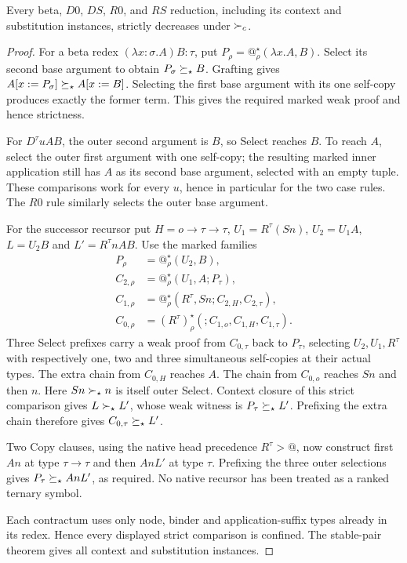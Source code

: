 \begin{theorem}\label{thm:orient}
Every beta, $D0$, $DS$, $R0$, and $RS$ reduction, including its context
and substitution instances, strictly decreases under $\succ_c$.
\end{theorem}
\begin{proof}
For a beta redex $(\lambda x:\sigma.A)B:\tau$, put
$P_\rho=@^\star_\rho(\lambda x.A,B)$. Select its second base argument
to obtain $P_\sigma\succeq_\star B$. Grafting gives
$A[x:=P_\sigma]\succeq_\star A[x:=B]$. Selecting the first base argument
with its one self-copy produces exactly the former term. This gives
the required marked weak proof and hence strictness.

For $D^\tau uAB$, the outer second argument is $B$, so Select reaches
$B$. To reach $A$, select the outer first argument with one self-copy;
the resulting marked inner application still has $A$ as its second
base argument, selected with an empty tuple. These comparisons work
for every $u$, hence in particular for the two case rules. The $R0$
rule similarly selects the outer base argument.

For the successor recursor put $H=o\to\tau\to\tau$,
$U_1=R^\tau(Sn)$, $U_2=U_1A$, $L=U_2B$ and $L'=R^\tau nAB$.
Use the marked families
\[
\begin{aligned}
 P_\rho&=@^\star_\rho(U_2,B),\\
 C_{2,\rho}&=@^\star_\rho(U_1,A;P_\tau),\\
 C_{1,\rho}&=@^\star_\rho(R^\tau,Sn;C_{2,H},C_{2,\tau}),\\
 C_{0,\rho}&=(R^\tau)^\star_\rho(;C_{1,o},C_{1,H},C_{1,\tau}).
\end{aligned}
\]
Three Select prefixes carry a weak proof from $C_{0,\tau}$ back to
$P_\tau$, selecting $U_2,U_1,R^\tau$ with respectively one, two and
three simultaneous self-copies at their actual types.
The extra chain from $C_{0,H}$ reaches $A$. The chain from $C_{0,o}$
reaches $Sn$ and then $n$. Here $Sn\succ_\star n$ is itself outer Select.
Context closure of this strict comparison gives $L\succ_\star L'$, whose
weak witness is $P_\tau\succeq_\star L'$. Prefixing the extra chain therefore
gives $C_{0,\tau}\succeq_\star L'$.

Two Copy clauses, using the native head precedence $R^\tau>@$, now
construct first $An$ at type $\tau\to\tau$ and then $AnL'$ at type
$\tau$. Prefixing the three outer selections gives
$P_\tau\succeq_\star AnL'$, as required. No native recursor has been treated
as a ranked ternary symbol.

Each contractum uses only node, binder and application-suffix types
already in its redex. Hence every displayed strict comparison is
confined. The stable-pair theorem gives all context and substitution
instances.
\end{proof}
